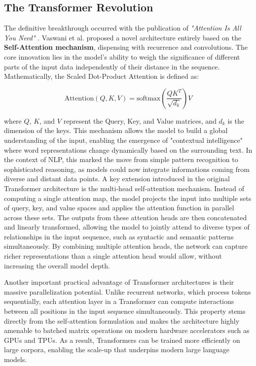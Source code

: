 \subsection{The Transformer Revolution}
The definitive breakthrough occurred with the publication of \textit{"Attention Is All You Need"} \cite{vaswani2017attention}. Vaswani et al. proposed a novel architecture entirely based on the \textbf{Self-Attention mechanism}, dispensing with recurrence and convolutions. The core innovation lies in the model's ability to weigh the significance of different parts of the input data independently of their distance in the sequence. Mathematically, the Scaled Dot-Product Attention is defined as:

\begin{equation}
    \text{Attention}(Q, K, V) = \text{softmax}\left(\frac{QK^T}{\sqrt{d_k}}\right)V
\end{equation}

where $Q$, $K$, and $V$ represent the Query, Key, and Value matrices, and $d_k$ is the dimension of the keys. This mechanism allows the model to build a global understanding of the input, enabling the emergence of "contextual intelligence" where word representations change dynamically based on the surrounding text. In the context of NLP, this marked the move from simple pattern recognition to sophisticated reasoning, as models could now integrate informations coming from diverse and distant data points.
A key extension introduced in the original Transformer architecture is the multi‑head self‑attention mechanism. Instead of computing a single attention map, the model projects the input into multiple sets of query, key, and value spaces and applies the attention function in parallel across these sets. The outputs from these attention heads are then concatenated and linearly transformed, allowing the model to jointly attend to diverse types of relationships in the input sequence, such as syntactic and semantic patterns simultaneously. By combining multiple attention heads, the network can capture richer representations than a single attention head would allow, without increasing the overall model depth.

Another important practical advantage of Transformer architectures is their massive parallelization potential. Unlike recurrent networks, which process tokens sequentially, each attention layer in a Transformer can compute interactions between all positions in the input sequence simultaneously. This property stems directly from the self‑attention formulation and makes the architecture highly amenable to batched matrix operations on modern hardware accelerators such as GPUs and TPUs. As a result, Transformers can be trained more efficiently on large corpora, enabling the scale‑up that underpins modern large language models.


